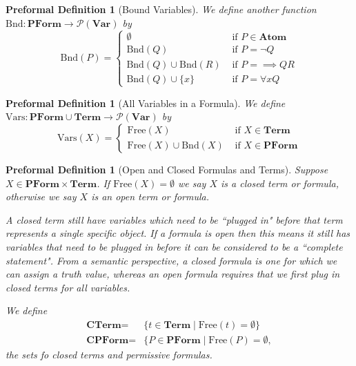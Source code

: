 \documentclass[oneside, 12pt]{book}
\theoremstyle{break}
\newtheorem{preformal definition}[definition]{Preformal Definition}
\newtheorem{preformal theorem}[theorem]{Preformal Theorem}
\newcommand{\mc}[1]{\mathcal{#1}}
\newcommand{\qq}[1]{``#1"}
\begin{document}
		\begin{preformal definition}[Bound Variables]
			We define another function $\text{Bnd}: \textbf{PForm} \to \mc{P}(\textbf{Var})$ by
			\begin{equation*}
				\text{Bnd}(P) = \begin{cases}
					\emptyset &\text{ if } P \in \textbf{Atom}\\
					\text{Bnd}(Q) &\text{ if } P = \lnot Q\\
					\text{Bnd}(Q) \cup \text{Bnd}(R) &\text{ if } P = \implies QR\\
					\text{Bnd}(Q) \cup \{x\} &\text{ if } P = \forall x Q
				\end{cases}
			\end{equation*}
		\end{preformal definition}
		
		\begin{preformal definition}[All Variables in a Formula]
			We define $\text{Vars}: \textbf{PForm} \cup \textbf{Term} \to \mc{P}(\textbf{Var})$ by
			\begin{equation*}
				\text{Vars}(X) = \begin{cases}
					\text{Free}(X) &\text{ if } X \in \textbf{Term}\\
					\text{Free}(X) \cup \text{Bnd}(X) &\text{ if } X \in \textbf{PForm}
				\end{cases}
			\end{equation*}
		\end{preformal definition}
		
		\begin{preformal definition}[Open and Closed Formulas and Terms]
			Suppose $X \in \textbf{PForm} \times \textbf{Term}$. 
			If $\text{Free}(X) = \emptyset$ we say $X$ is a closed term or formula, otherwise we say $X$ is an open term or formula.
			
			A closed term still have variables which need to be \qq{plugged in} before that term represents a single specific object.
			If a formula is open then this means it still has variables that need to be plugged in before it can be considered to be a \qq{complete statement}.
			From a semantic perspective, a closed formula is one for which we can assign a truth value, whereas an open formula requires that we first plug in closed terms for all variables.
			
			We define
			\begin{align*}
				\textbf{CTerm} =& \{t \in \textbf{Term} \mid \text{Free}(t) = \emptyset\}\\
				\textbf{CPForm} =& \{P \in \textbf{PForm} \mid \text{Free}(P) = \emptyset,
			\end{align*}
			the sets fo closed terms and permissive formulas.
		\end{preformal definition}
		
\end{document}

